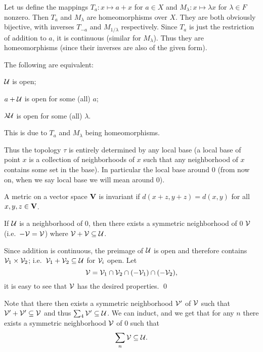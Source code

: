 Let us define the mappings $T_a\colon x\mapsto a+x$ for $a\in X$ and $M_\lambda\colon x\mapsto\lambda x$ for $\lambda\in F$ nonzero.
Then $T_a$ and $M_\lambda$ are homeomorphisms over $X$.
They are both obviously bijective, with inverses $T_{-a}$ and $M_{1/\lambda}$ respectively.
Since $T_a$ is just the restriction of addition to $a$, it is continuous (similar for $M_\lambda$).
Thus they are homeomorphisms (since their inverses are also of the given form).

\bprop

    The following are equivalent:
    \benum
        \item ${\cal U}$ is open;
        \item $a+{\cal U}$ is open for some (all) $a$;
        \item $\lambda{\cal U}$ is open for some (all) $\lambda$.
    \eenum

\eprop

This is due to $T_a$ and $M_\lambda$ being homeomorphisms.

Thus the topology $\tau$ is entirely determined by any local base (a local base of point $x$ is a collection of neighborhoods of $x$ such that any neighborhood of $x$ contains some set in the base).
In particular the local base around $0$ (from now on, when we say local base we will mean around $0$).

\bdefn

    A metric on a vector space ${\bf V}$ is {\emphcolor invariant} if $d(x+z,y+z)=d(x,y)$ for all $x,y,z\in {\bf V}$.

\edefn

\blemm

    If ${\cal U}$ is a neighborhood of $0$, then there exists a symmetric neighborhood of $0$ ${\cal V}$ (i.e.\ $-{\cal V}={\cal V}$) where ${\cal V}+{\cal V}\subseteq{\cal U}$.

\elemm

\bproof

    Since addition is continuous, the preimage of ${\cal U}$ is open and therefore contains ${\cal V}_1\times{\cal V}_2$; i.e.\ ${\cal V}_1+{\cal V}_2\subseteq{\cal U}$ for ${\cal V}_i$ open.
    Let
    $$ {\cal V} = {\cal V}_1\cap{\cal V}_2\cap(-{\cal V}_1)\cap(-{\cal V}_2), $$
    it is easy to see that ${\cal V}$ has the desired properties.
    \qed

\eproof

Note that there then exists a symmetric neighborhood ${\cal V}'$ of ${\cal V}$ such that ${\cal V}'+{\cal V}'\subseteq{\cal V}$ and thus $\sum_4{\cal V}'\subseteq{\cal U}$.
We can induct, and we get that for any $n$ there exists a symmetric neighborhood ${\cal V}$ of $0$ such that
$$ \sum_n{\cal V}\subseteq{\cal U} . $$

